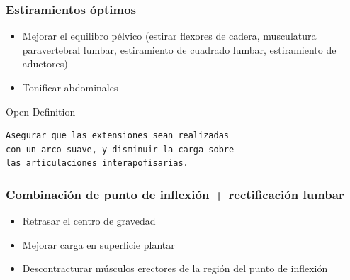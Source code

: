\documentclass[hyperref={pdfpagelabels=false},xcolor=pst,pdf,fragile]{beamer}
\begin{document}
\begin{frame}[fragile]
  \frametitle{Estiramientos óptimos}
  \begin{itemize}
	\item Mejorar el equilibro pélvico (estirar flexores de cadera, musculatura paravertebral lumbar, estiramiento de cuadrado lumbar, estiramiento de aductores)
	\pause
	\item Tonificar abdominales
	\pause
  \end{itemize}

    \begin{block}{Open Definition} %
	  \begin{lstlisting}
Asegurar que las extensiones sean realizadas 
con un arco suave, y disminuir la carga sobre 
las articulaciones interapofisarias.

	  \end{lstlisting}
  \end{block}
  
\end{frame}

\begin{frame}
  \frametitle{Combinación de punto de inflexión + rectificación lumbar}
  \begin{itemize}
	\item Retrasar el centro de gravedad
	\pause
	\item Mejorar carga en superficie plantar
	\pause
	\item Descontracturar músculos erectores de la región del punto de inflexión
  \end{itemize}
\end{frame}
\end{document}
